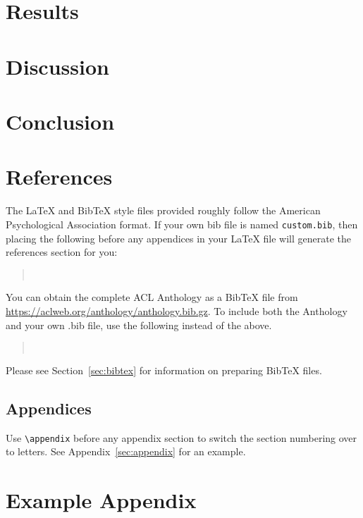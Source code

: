 \documentclass[11pt]{article}
\begin{document}
\section{Results}
\section{Discussion}
\section{Conclusion}

\section{References}

\nocite{Ando2005,augenstein-etal-2016-stance,andrew2007scalable,rasooli-tetrault-2015,goodman-etal-2016-noise,harper-2014-learning}

The \LaTeX{} and Bib\TeX{} style files provided roughly follow the American Psychological Association format.
If your own bib file is named \texttt{custom.bib}, then placing the following before any appendices in your \LaTeX{} file will generate the references section for you:
\begin{quote}
\begin{verbatim}


\end{verbatim}
\end{quote}
You can obtain the complete ACL Anthology as a Bib\TeX{} file from \url{https://aclweb.org/anthology/anthology.bib.gz}.
To include both the Anthology and your own .bib file, use the following instead of the above.
\begin{quote}
\begin{verbatim}


\end{verbatim}
\end{quote}
Please see Section~\ref{sec:bibtex} for information on preparing Bib\TeX{} files.

\subsection{Appendices}

Use \verb|\appendix| before any appendix section to switch the section numbering over to letters. See Appendix~\ref{sec:appendix} for an example.





\appendix

\section{Example Appendix}
\end{document}
